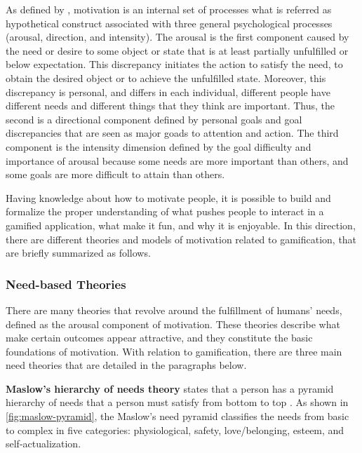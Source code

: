 As defined by , motivation is an internal set of processes what is referred as hypothetical construct associated with three general psychological processes (arousal, direction, and intensity). The arousal is the first component caused by the need or desire to some object or state that is at least partially unfulfilled or below expectation. This discrepancy initiates the action to satisfy the need, to obtain the desired object or to achieve the unfulfilled state. Moreover, this discrepancy is personal, and differs in each individual, different people have different needs and different things that they think are important. Thus, the second is a directional component defined by personal goals and goal discrepancies that are seen as major goads to attention and action. The third component is the intensity dimension defined by the goal difficulty and importance of arousal because some needs are more
important than others, and some goals are more difficult to attain
than others.

Having knowledge about how to motivate people, it is possible to build and formalize the proper understanding of what pushes people to interact in a gamified application, what make it fun, and why it is enjoyable. In this direction, there are different theories and models of motivation related to gamification, that are briefly summarized as follows. 

\subsubsection{Need-based Theories}
\label{subsubsec:need-theories}

There are many theories that revolve around the fulfillment of humans' needs, defined as the arousal component of motivation. 
These theories describe what make certain outcomes appear attractive, and they constitute the basic foundations of motivation. 
With relation to gamification, there are three main need theories that are detailed in the paragraphs below.

\textbf{Maslow's hierarchy of needs theory} states that a person has a pyramid hierarchy of needs that a person must satisfy from bottom to top \cite{Maslow1954,Goble1970}. As shown in \autoref{fig:maslow-pyramid}, the Maslow's need pyramid classifies the needs from basic to complex in five categories: physiological, safety, love/belonging, esteem, and self-actualization.

